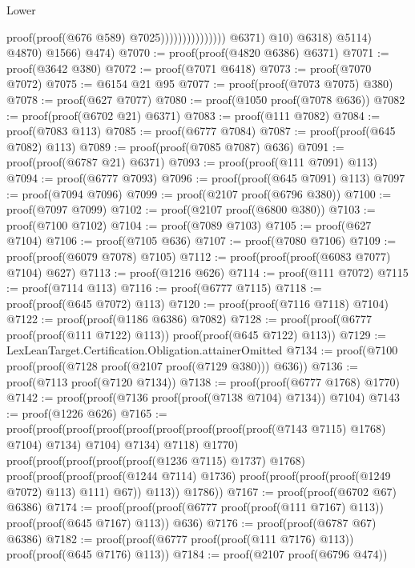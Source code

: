 \begin{lexlean}{Lower}
\begin{coremodule}
                                                          proof(proof(@676 @589)
                                                              @7025)))))))))))))))
                  @6371)
                @10)
              @6318)
            @5114)
          @4870)
        @1566)
      @474)
@7070 := proof(proof(@4820 @6386) @6371)
@7071 := proof(@3642 @380)
@7072 := proof(@7071 @6418)
@7073 := proof(@7070 @7072)
@7075 := @6154 @21 @95
@7077 := proof(proof(@7073 @7075) @380)
@7078 := proof(@627 @7077)
@7080 := proof(@1050 proof(@7078 @636))
@7082 := proof(proof(@6702 @21) @6371)
@7083 := proof(@111 @7082)
@7084 := proof(@7083 @113)
@7085 := proof(@6777 @7084)
@7087 := proof(proof(@645 @7082) @113)
@7089 := proof(proof(@7085 @7087) @636)
@7091 := proof(proof(@6787 @21) @6371)
@7093 := proof(proof(@111 @7091) @113)
@7094 := proof(@6777 @7093)
@7096 := proof(proof(@645 @7091) @113)
@7097 := proof(@7094 @7096)
@7099 := proof(@2107 proof(@6796 @380))
@7100 := proof(@7097 @7099)
@7102 := proof(@2107 proof(@6800 @380))
@7103 := proof(@7100 @7102)
@7104 := proof(@7089 @7103)
@7105 := proof(@627 @7104)
@7106 := proof(@7105 @636)
@7107 := proof(@7080 @7106)
@7109 := proof(proof(@6079 @7078) @7105)
@7112 := proof(proof(proof(@6083 @7077) @7104) @627)
@7113 := proof(@1216 @626)
@7114 := proof(@111 @7072)
@7115 := proof(@7114 @113)
@7116 := proof(@6777 @7115)
@7118 := proof(proof(@645 @7072) @113)
@7120 := proof(proof(@7116 @7118) @7104)
@7122 := proof(proof(@1186 @6386) @7082)
@7128 := proof(proof(@6777 proof(proof(@111 @7122) @113)) proof(proof(@645 @7122) @113))
@7129 := LexLeanTarget.Certification.Obligation.attainerOmitted
@7134 := proof(@7100 proof(proof(@7128 proof(@2107 proof(@7129 @380))) @636))
@7136 := proof(@7113 proof(@7120 @7134))
@7138 := proof(proof(@6777 @1768) @1770)
@7142 := proof(proof(@7136 proof(proof(@7138 @7104) @7134)) @7104)
@7143 := proof(@1226 @626)
@7165 := proof(proof(proof(proof(proof(proof(proof(proof(proof(@7143 @7115) @1768) @7104) @7134)
              @7104)
            @7134)
          @7118)
        @1770)
      proof(proof(proof(proof(proof(@1236 @7115) @1737) @1768)
            proof(proof(proof(proof(@1244 @7114) @1736)
                  proof(proof(proof(proof(@1249 @7072) @113) @111) @67))
                @113))
          @1786))
@7167 := proof(proof(@6702 @67) @6386)
@7174 := proof(proof(proof(@6777 proof(proof(@111 @7167) @113)) proof(proof(@645 @7167) @113)) @636)
@7176 := proof(proof(@6787 @67) @6386)
@7182 := proof(proof(@6777 proof(proof(@111 @7176) @113)) proof(proof(@645 @7176) @113))
@7184 := proof(@2107 proof(@6796 @474))

\end{coremodule}
\end{lexlean}
